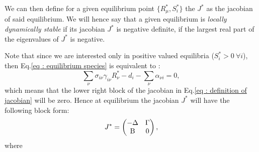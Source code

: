 \documentclass[12pt, titlepage]{report}
\begin{document}
We can then define for a given equilibrium point $\{R^*_\mu, S^*_i\}$ the  $J^*$ as the jacobian of said equilibrium.
We will hence say that a given equilibrium is \textit{locally dynamically stable} if its jacobian $J^*$ is negative definite, \ie if the largest real part of the eigenvalues of $J^*$ is negative.

Note that since we are interested only in positive valued equilibria (\ie $S^*_i > 0 \ \forall i$), then Eq.\eqref{eq : equilibrium species} is equivalent to :
\begin{equation}
  \sum_\nu \sigma_{i\nu} \gamma_{i\nu}R^*_\nu -d_i - \sum_\nu \alpha_{\nu i} = 0,
\end{equation}
which means that the lower right block of the jacobian in Eq.\eqref{eq : definition of jacobian} will be zero. Hence at equilibrium the jacobian $J^*$ will have the following block form:
\begin{equation}
  J^* = \begin{pmatrix}
  -\Delta & \Gamma \\
  \text{B} & 0
\end{pmatrix}, \label{eq : jacobian at equilibrium}
\end{equation}
where

\begin{centering}
\end{centering}
\end{document}
